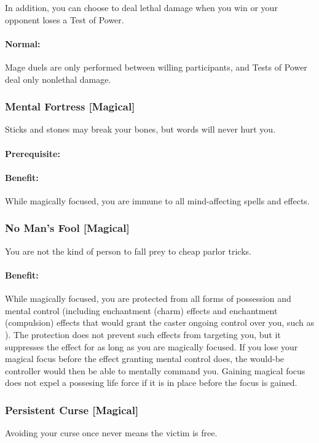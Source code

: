 In addition, you can choose to deal lethal damage when you win or your opponent loses a Test of Power.
\paragraph{Normal:} Mage duels are only performed between willing participants, and Tests of Power deal only nonlethal damage.

\subsubsection[Mental Fortress]{Mental Fortress [Magical]}
\label{Feat:MentalFortress}
Sticks and stones may break your bones, but words will never hurt you.
\paragraph{Prerequisite:} 
\paragraph{Benefit:} While magically focused, you are immune to all mind-affecting spells and effects.

\subsubsection[No Man's Fool]{No Man's Fool [Magical]}
\label{Feat:NoMansFool}
You are not the kind of person to fall prey to cheap parlor tricks.
\paragraph{Benefit:} While magically focused, you are protected from all forms of possession and mental control (including enchantment (charm) effects and enchantment (compulsion) effects that would grant the caster ongoing control over you, such as ). 
The protection does not prevent such effects from targeting you, but it suppresses the effect for as long as you are magically focused. 
If you lose your magical focus before the effect granting mental control does, the would-be controller would then be able to mentally command you. 
Gaining magical focus does not expel a possesing life force if it is in place before the focus is gained. 

\subsubsection[Persistent Curse]{Persistent Curse [Magical]}
\label{Feat:PersistentCurse}
Avoiding your curse once never means the victim is free.
